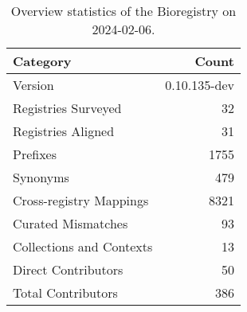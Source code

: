 \begin{table}
\caption{Overview statistics of the Bioregistry on 2024-02-06.}
\label{tab:bioregistry-summary}
\begin{tabular}{lr}
\toprule
Category & Count \\
\midrule
Version & 0.10.135-dev \\
Registries Surveyed & 32 \\
Registries Aligned & 31 \\
Prefixes & 1755 \\
Synonyms & 479 \\
Cross-registry Mappings & 8321 \\
Curated Mismatches & 93 \\
Collections and Contexts & 13 \\
Direct Contributors & 50 \\
Total Contributors & 386 \\
\bottomrule
\end{tabular}
\end{table}
